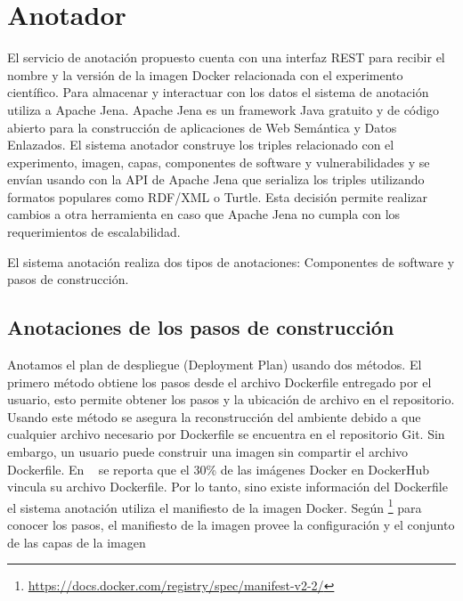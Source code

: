 \section{Anotador}\label{s4.2}

El servicio de anotación propuesto cuenta con una interfaz REST para recibir el nombre y la versión de la imagen Docker relacionada con el experimento científico. 
Para almacenar y interactuar con los datos el sistema de anotación utiliza a Apache Jena. Apache Jena es un framework Java gratuito y de código abierto para la construcción de aplicaciones de Web Semántica y Datos Enlazados. El sistema anotador construye los triples relacionado con el experimento, imagen, capas, componentes de software y vulnerabilidades y se envían usando con la API de Apache Jena que serializa los triples utilizando formatos populares como RDF/XML o Turtle.
Esta decisión permite realizar cambios a otra herramienta en caso que Apache Jena no cumpla con los requerimientos de escalabilidad.

El sistema anotación realiza dos tipos de anotaciones: Componentes de software y pasos de construcción.


\subsection{Anotaciones de los pasos de construcción}\label{s4.2.1}

Anotamos el plan de despliegue (Deployment Plan) usando dos métodos. El primero método obtiene los pasos desde el archivo Dockerfile entregado por el usuario, esto permite obtener los pasos y la ubicación de archivo en el repositorio. 
Usando este método se asegura la reconstrucción del ambiente debido a que cualquier archivo necesario por Dockerfile se encuentra en el repositorio Git.
Sin embargo, un usuario puede construir una imagen sin compartir el archivo Dockerfile. En ~\cite{DBLP:conf/semweb/OsorioAV18a} se reporta que el 30\% de las imágenes Docker en DockerHub vincula su archivo Dockerfile. 
Por lo tanto, sino existe información del Dockerfile el sistema anotación utiliza el manifiesto de la imagen Docker. Según \footnote{\url{https://docs.docker.com/registry/spec/manifest-v2-2/}} para conocer los pasos, el manifiesto de la imagen provee la configuración y el conjunto de las capas de la imagen

